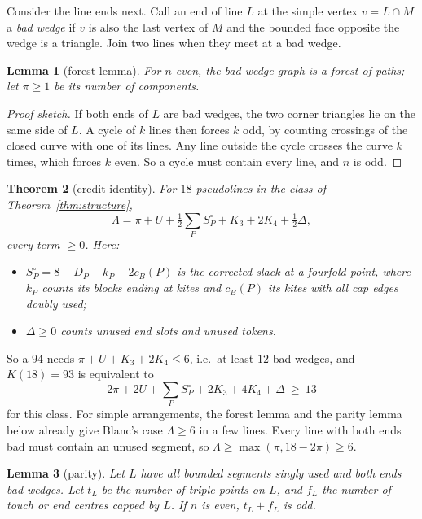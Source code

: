 \documentclass[11pt]{article}
\newtheorem{theorem}{Theorem}
\newtheorem{lemma}[theorem]{Lemma}
\theoremstyle{definition}
\theoremstyle{remark}
\newcommand{\Lam}{\Lambda}
\begin{document}
Consider the line ends next. Call an end of line $L$ at the simple vertex $v=L\cap M$ a \emph{bad wedge} if $v$ is also
the last vertex of $M$ and the bounded face opposite the wedge is a triangle. Join two lines when they meet at a bad
wedge.

\begin{lemma}[forest lemma]
For $n$ even, the bad-wedge graph is a forest of paths; let $\pi\ge 1$ be its number of components.
\end{lemma}
\begin{proof}[Proof sketch]
If both ends of $L$ are bad wedges, the two corner triangles lie on the same side of $L$. A cycle of $k$ lines then
forces $k$ odd, by counting crossings of the closed curve with one of its lines. Any line outside the cycle crosses
the curve $k$ times, which forces $k$ even. So a cycle must contain every line, and $n$ is odd.
\end{proof}

\begin{theorem}[credit identity]\label{thm:identity}
For $18$ pseudolines in the class of Theorem~\ref{thm:structure},
\[
\Lam=\pi+U+\tfrac12\sum_P S^\circ_P+K_3+2K_4+\tfrac12\Delta,
\]
every term $\ge 0$. Here:
\begin{itemize}[nosep]
\item $S^\circ_P=8-D_P-k_P-2c_B(P)$ is the corrected slack at a fourfold point, where $k_P$ counts its blocks ending at
kites and $c_B(P)$ its kites with all cap edges doubly used;
\item $\Delta\ge 0$ counts unused end slots and unused tokens.
\end{itemize}
\end{theorem}

\noindent So a $94$ needs $\pi+U+K_3+2K_4\le 6$, i.e.\ at least $12$ bad wedges, and $K(18)=93$ is equivalent to
\[
2\pi+2U+\textstyle\sum_P S^\circ_P+2K_3+4K_4+\Delta\ \ge\ 13
\]
for this class. For simple arrangements, the forest lemma and the parity lemma below already give Blanc's case
$\Lam\ge 6$ in a few lines. Every line with both ends bad must contain an unused segment, so
$\Lam\ge\max(\pi,18-2\pi)\ge 6$.

\begin{lemma}[parity]
Let $L$ have all bounded segments singly used and both ends bad wedges. Let $t_L$ be the number of triple points on
$L$, and $f_L$ the number of touch or end centres capped by $L$. If $n$ is even, $t_L+f_L$ is odd.
\end{lemma}
\end{document}
